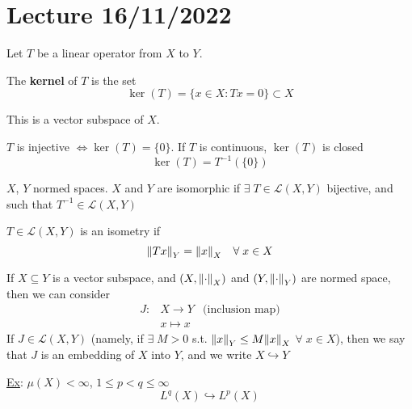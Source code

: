 \section{Lecture 16/11/2022}
Let \(T\) be a linear operator from \(X\) to \(Y\).
\begin{definition}
    The \textbf{kernel} of \(T\) is the set 
    \[
        \ker(T) = \{ x \in X: Tx =0\} \subset X
    \]

\end{definition}

This is a vector subspace of \(X\). 

\(T\) is injective \(\Leftrightarrow \ker (T) = \{0\}\). If \(T\) is continuous, \(\ker(T)\) is closed 
\[
    \ker(T) = T^{-1} (\{0\})
\]
\begin{definition}
    \(X\), \(Y\) normed spaces. \(X\) and \(Y\) are isomorphic if \(\exists \; T \in \mathcal{L}(X, Y)\) bijective, and such that \(T^{-1} \in \mathcal{L}(X, Y)\)
\end{definition}
\begin{definition}
    \(T \in \mathcal{L}(X, Y)\) is an isometry if
    \[
        \norm{Tx}_Y = \norm{x}_X \quad \forall \; x \in X
    \]
\end{definition}
\begin{definition}
    If \(X \subseteq Y\) is a vector subspace, and \(\left(X, \norm{\cdot}_X\right)\) and \(\left(Y, \norm{\cdot}_Y\right)\) are normed space, then we can consider 
    \[
        \begin{array}{rcr}
            J: & X \to Y & \text{(inclusion map)}
            \\ & x \mapsto x
        \end{array}
    \] 
    If \(J \in \mathcal{L}(X, Y)\) (namely, if \(\exists \; M>0 \) s.t. \(\norm{x}_Y \leq M \norm{x}_X\) \(\forall \; x \in X\)), 
    then we say that \(J\) is an embedding of \(X\) into \(Y\), and we write \(X \hookrightarrow Y\)
\end{definition}

\noindent\underline{Ex}: \(\mu(X) < \infty \), \(1 \leq p < q \leq \infty\)
\[
    L^q(X) \hookrightarrow L^p(X) \tag*{(inclusion of \(L^p\) spaces)}
\]

